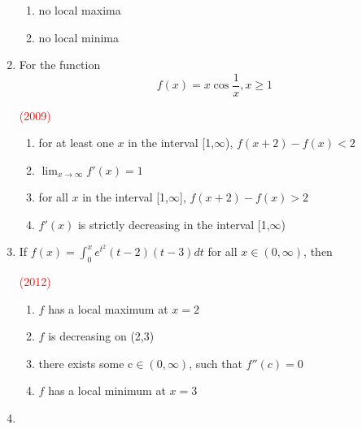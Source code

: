 \documentclass[journal,12pt,twocolumn]{IEEEtran}
\theoremstyle{remark}
\begin{document}
\begin{enumerate}[start = 7]
{\begin{flushleft}
\begin{enumerate}
                \item no local maxima
                \item no local minima
            \end{enumerate}
        \end{flushleft}
        }
    \item{
        \begin{flushleft}
            For the function $$f(x) = x\cos{\frac{1}{x}}, x\geq1$$
            \begin{flushright}
                \textcolor{red}{(2009)}
            \end{flushright}
            \begin{enumerate}
                \item for at least one $x$ in the interval [1,$\infty$), $f(x+2)-f(x)<2$
                \item $\lim_{x\to\infty} f'(x) = 1$
                \item for all $x$ in the interval [1,$\infty$], $f(x+2)-f(x)>2$
                \item $f'(x)$ is strictly decreasing in the interval [1,$\infty$)
            \end{enumerate}
        \end{flushleft}
        }
    \item{
        \begin{flushleft}
            If $f(x)= \int_{0}^x e^{t^2}(t-2)(t-3)dt$ for all $x \in(0,\infty)$, then
            \begin{flushright}
                \textcolor{red}{(2012)}
            \end{flushright}
            \begin{enumerate}
                \item $f$ has a local maximum at $x=2$ 
                \item $f$ is decreasing on (2,3)
                \item there exists some c$\in(0,\infty)$, such that $f''(c)=0$
                \item $f$ has a local minimum at $x=3$
            \end{enumerate}
        \end{flushleft}
        }
    \item{
    
}
\end{enumerate}
\end{document}
